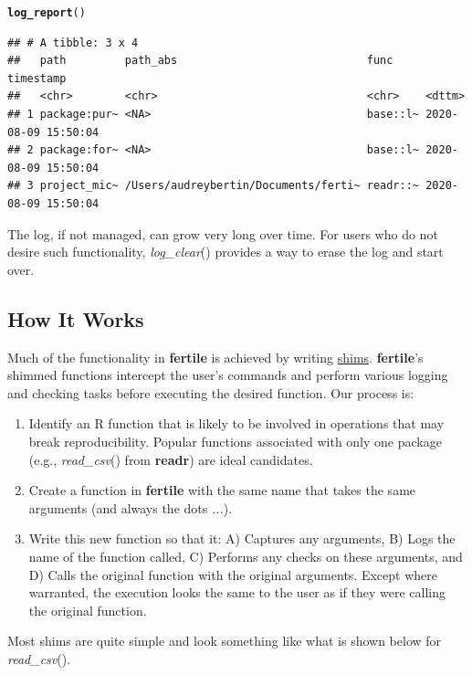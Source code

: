 \documentclass[APA,LATO1COL]{WileyNJD-v2}\usepackage[]{graphicx}\usepackage[]{color}
\makeatletter
\newcommand{\hlstd}[1]{\textcolor[rgb]{0.345,0.345,0.345}{#1}}%
\newcommand{\hlkwd}[1]{\textcolor[rgb]{0.737,0.353,0.396}{\textbf{#1}}}%
\newenvironment{kframe}{%
 \def\at@end@of@kframe{}%
 \ifinner\ifhmode%
  \def\at@end@of@kframe{\end{minipage}}%
  \begin{minipage}{\columnwidth}%
 \fi\fi%
 \def\FrameCommand##1{\hskip\@totalleftmargin \hskip-\fboxsep
 \colorbox{shadecolor}{##1}\hskip-\fboxsep
     \hskip-\linewidth \hskip-\@totalleftmargin \hskip\columnwidth}%
 \MakeFramed {\advance\hsize-\width
   \@totalleftmargin\z@ \linewidth\hsize
   \@setminipage}}%
 {\par\unskip\endMakeFramed%
 \at@end@of@kframe}
\newenvironment{knitrout}{}{} %
\newcommand{\R}{\textsf{R}\xspace}
\newcommand{\cmd}[1]{\textit{#1}}
\newcommand{\pkg}[1]{\textbf{#1}}
\newcommand{\func}[1]{\textit{#1}()}
\makeatother
\begin{document}
\begin{knitrout}
\color{fgcolor}\begin{kframe}
\begin{alltt}
\hlkwd{log_report}\hlstd{()}
\end{alltt}
\begin{verbatim}
## # A tibble: 3 x 4
##   path         path_abs                             func     timestamp          
##   <chr>        <chr>                                <chr>    <dttm>             
## 1 package:pur~ <NA>                                 base::l~ 2020-08-09 15:50:04
## 2 package:for~ <NA>                                 base::l~ 2020-08-09 15:50:04
## 3 project_mic~ /Users/audreybertin/Documents/ferti~ readr::~ 2020-08-09 15:50:04
\end{verbatim}
\end{kframe}
\end{knitrout}

The log, if not managed, can grow very long over time. For users who do not desire such functionality, \func{log\_clear} provides a way to erase the log and start over.




\subsection{How It Works}

Much of the functionality in \pkg{fertile} is achieved by writing \href{https://en.wikipedia.org/wiki/Shim_(computing)}{shims}. \pkg{fertile}'s shimmed functions intercept the user's commands and perform various logging and checking tasks before executing the desired function. Our process is:

\begin{enumerate}[noitemsep]
\item Identify an \R function that is likely to be involved in operations that may break reproducibility. Popular functions associated with only one package (e.g., \func{read\_csv} from \pkg{readr}) are ideal candidates.
\item Create a function in \pkg{fertile} with the same name that takes the same arguments (and always the dots \cmd{...}).
\item Write this new function so that it: A) Captures any arguments, B) Logs the name of the function called, C) Performs any checks on these arguments, and D) Calls the original function with the original arguments. Except where warranted, the execution looks the same to the user as if they were calling the original function.
\end{enumerate}
Most shims are quite simple and look something like what is shown below for \func{read\_csv}. 
\end{document}
